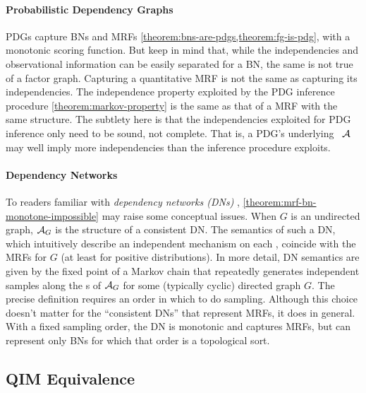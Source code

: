 \paragraph{Probabilistic Dependency Graphs}
PDGs capture BNs and MRFs
\cref{theorem:bns-are-pdgs,theorem:fg-is-pdg},
with a monotonic scoring function.
But keep in mind that, while the independencies and observational information can be easily separated for a BN, the same is not true of a factor graph.
Capturing a quantitative MRF is not the same as capturing its independencies.
The independence property exploited by the PDG inference procedure \cref{theorem:markov-property} is the same as that of a MRF with the same structure. 
The subtlety here is that the independencies exploited for PDG inference only need to be sound, not complete. 
That is, a PDG's underlying \hgraph\ $\mathcal A$ may well imply more independencies than the inference procedure exploits. 
    

\paragraph{Dependency Networks}
To readers familiar with \emph{dependency networks (DNs)} \citep{heckerman2000dependency},
\cref{theorem:mrf-bn-monotone-impossible} may raise some conceptual issues. 
When $G$ is an undirected graph, $\mathcal A_G$ is the structure of a consistent DN.
The semantics of such a DN,
which intuitively describe an independent mechanism on each \arc,
coincide with the MRFs for $G$ (at least for positive distributions). 
In more detail, DN semantics are given by the fixed point of a Markov chain that repeatedly generates independent samples along the \arc s of $\mathcal A_G$ for some (typically cyclic) directed graph $G$. The precise definition requires an order in which to do sampling. Although this choice doesn't matter for the ``consistent DNs'' that represent MRFs, it does in general. With a fixed sampling order, the DN is monotonic and captures MRFs, but can represent only BNs for which that order is a topological sort.



\subsection{QIM Equivalence}
    \label{sec:QIM-equivalence}

